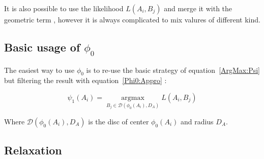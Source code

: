 It is also possible to use the likelihood $L(A_i,B_j)$ and merge it with the geometric term , 
however it is always complicated to mix valures of different kind.


\subsection{Basic usage of $\phi_0$}

The easiest way to use $\phi_0$ is to re-use the basic strategy of 
equation~\ref{ArgMax:Psi} but filtering the result with  equation~\ref{Phi0:Appro}  :


\begin{equation}
   \psi_1(A_i) =  \underset{B_j \in \mathcal D(\phi_0(A_i),D_A)}{\operatorname{argmax}}  L(A_i,B_j) 
\end{equation}

Where  $\mathcal D(\phi_0(A_i),D_A)$ is  the disc of center $\phi_0(A_i)$ and radius $D_A$.

\label{Basic:ArgMax}

\subsection{Relaxation}





